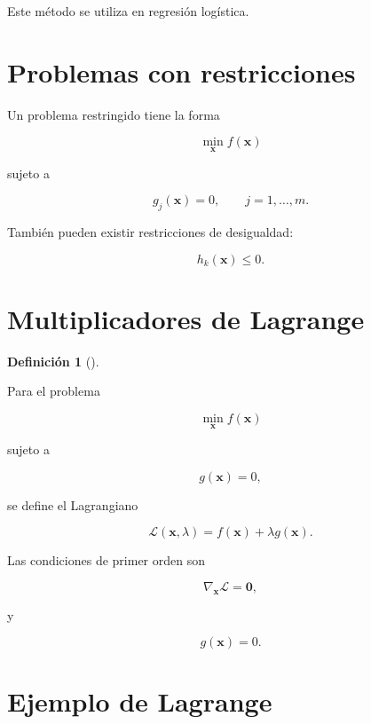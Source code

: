 \documentclass[
  spanish,
  10.5pt,
  letterpaper,
  DIV=11,
  numbers=noendperiod,
  oneside,
  open=any]{scrreprt}
\theoremstyle{definition}
\newtheorem{definition}{Definición}[chapter]
\theoremstyle{definition}
\theoremstyle{plain}
\theoremstyle{remark}
\begin{document}
Este método se utiliza en regresión logística.

\section*{Problemas con
restricciones}\label{problemas-con-restricciones}


Un problema restringido tiene la forma

\[
\min_{\mathbf{x}}
f(\mathbf{x})
\]

sujeto a

\[
g_j(\mathbf{x})=0,
\qquad
j=1,\ldots,m.
\]

También pueden existir restricciones de desigualdad:

\[
h_k(\mathbf{x})\leq 0.
\]

\section*{Multiplicadores de
Lagrange}\label{multiplicadores-de-lagrange}


\begin{definition}[]\protect\hypertarget{def-lagrangiano}{}\label{def-lagrangiano}

Para el problema

\[
\min_{\mathbf{x}}
f(\mathbf{x})
\]

sujeto a

\[
g(\mathbf{x})=0,
\]

se define el Lagrangiano

\[
\mathcal{L}(
\mathbf{x},\lambda
)
=
f(\mathbf{x})
+
\lambda g(\mathbf{x}).
\]

\end{definition}

Las condiciones de primer orden son

\[
\nabla_{\mathbf{x}}
\mathcal{L}
=
\mathbf{0},
\]

y

\[
g(\mathbf{x})=0.
\]

\section*{Ejemplo de Lagrange}\label{ejemplo-de-lagrange}
\end{document}

